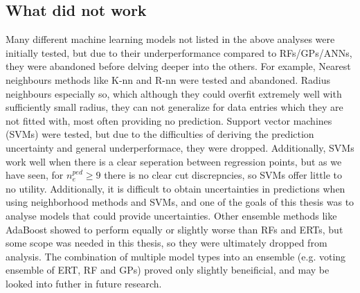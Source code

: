\documentclass[a4paper, twoside, final, 12pt]{article}
\begin{document}
{
\subsection{What did not work}
Many different machine learning models not listed in the above analyses were initially tested, but due to their underperformance compared to RFs/GPs/ANNs, they were abandoned before delving deeper into the others. For example, Nearest neighbours methods like K-nn and R-nn were tested and abandoned. Radius neighbours especially so, which although they could overfit extremely well with sufficiently small radius, they can not generalize for data entries which they are not fitted with, most often providing no prediction. Support vector machines (SVMs) were tested, but due to the difficulties of deriving the prediction uncertainty and general underperformace, they were dropped. Additionally, SVMs work well when there is a clear seperation between regression points, but as we have seen, for $n_e^{ped} \geq 9$ there is no clear cut discrepncies, so SVMs offer little to no utility. Additionally, it is difficult to obtain uncertainties in predictions when using neighborhood methods and SVMs, and one of the goals of this thesis was to analyse models that could provide uncertainties. Other ensemble methods like AdaBoost showed to perform equally or slightly worse than RFs and ERTs, but some scope was needed in this thesis, so they were ultimately dropped from analysis. The combination of multiple model types into an ensemble (e.g. voting ensemble of ERT, RF and GPs) proved only slightly beneificial, and may be looked into futher in future research. 
}
\end{document}
